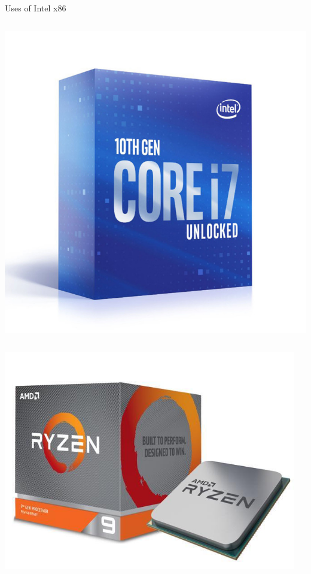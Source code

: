 \begin{frame}{Uses of Intel x86}
\begin{columns}
\begin{column}{0.32\textwidth}
			\pause\includegraphics[width=\textwidth]{intel_i7}
		\end{column}
	\end{columns}
	\begin{columns}
		\begin{column}{0.32\textwidth}
			\pause\includegraphics[width=\textwidth]{amd_ryzen}
		\end{column}
		\begin{column}{0.32\textwidth}

\end{column}
\end{columns}
\end{frame}
